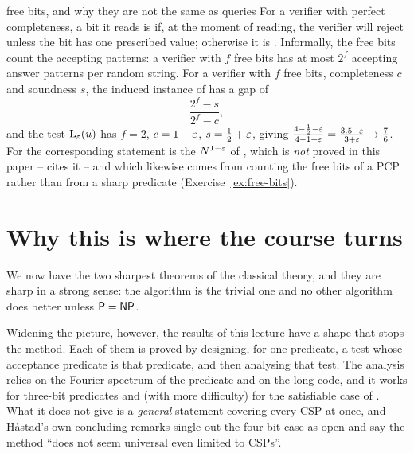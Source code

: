 \begin{pitfall}{free bits, and why they are not the same as queries}
For a verifier with perfect completeness, a bit it reads is  if, at the moment of reading, the verifier will reject unless the bit has one prescribed value; otherwise it is .  Informally, the free bits count the accepting patterns: a verifier with $f$ free bits has at most $2^f$ accepting answer patterns per random string.  For a verifier with $f$ free bits, completeness $c$ and soundness $s$, the induced instance of  has a gap of
\begin{equation}\label{eq:freebits}
  \frac{2^{f}-s}{2^{f}-c},
\end{equation}
and the test $\mathrm{L}_\varepsilon(u)$ has $f=2$, $c=1-\varepsilon$, $s=\tfrac12+\varepsilon$, giving $\frac{4-\frac12-\varepsilon}{4-1+\varepsilon}=\frac{3.5-\varepsilon}{3+\varepsilon}\to\frac76$.
For  the corresponding statement is the $N^{1-\varepsilon}$ of \citet{Hastad99}, which is \emph{not} proved in this paper -- \cite{Hastad01} cites it -- and which likewise comes from counting the free bits of a PCP rather than from a sharp predicate (Exercise~\ref{ex:free-bits}).
\end{pitfall}


\section{Why this is where the course turns}
\label{sec:towards-ugc}

We now have the two sharpest theorems of the classical theory, and they are sharp in a strong sense: the algorithm is the trivial one and no other algorithm does better unless $\mathsf{P}=\mathsf{NP}$.

Widening the picture, however, the results of this lecture have a shape that stops the method.  Each of them is proved by designing, for one predicate, a test whose acceptance predicate is that predicate, and then analysing that test.  The analysis relies on the Fourier spectrum of the predicate and on the long code, and it works for three-bit predicates and (with more difficulty) for the satisfiable case of .  What it does not give is a \emph{general} statement covering every CSP at once, and H\aa stad's own concluding remarks single out the four-bit case as open and say the method ``does not seem universal even limited to CSPs''.


